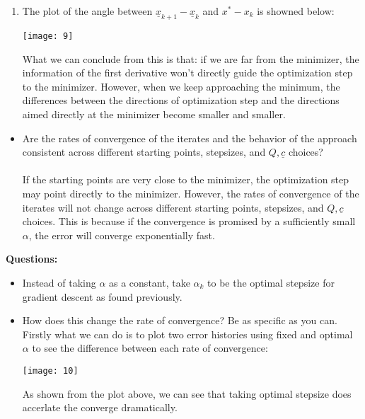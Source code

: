 \documentclass[11pt,letterpaper]{article}
\begin{document}
\begin{tcolorbox}
    \begin{enumerate}[\quad\quad]
        \item The plot of the angle between $\underline x_{k+1}-\underline x_k$ and $x^\ast - x_k$ is showned below:
        \begin{center}
            \texttt{[image: 9]}
        \end{center}
        \begin{flushleft}
        \justifying
            What we can conclude from this is that: if we are far from the minimizer, the information of the first derivative won't directly guide the optimization step to the minimizer. However, when we keep approaching the minimum, the differences between the directions of optimization step and the directions aimed directly at the minimizer become smaller and smaller.
        \end{flushleft}
    \end{enumerate}
    \bigskip
    \begin{itemize}
        \item Are the rates of convergence of the iterates and the behavior of the approach consistent across different starting points, stepsizes, and $Q, \underline c$ choices?
        \\\\
        If the starting points are very close to the minimizer, the optimization step may point directly to the minimizer. However, the rates of convergence of the iterates will not change across different starting points, stepsizes, and $Q, \underline c$ choices. This is because if the convergence is promised by a sufficiently small $\alpha$, the error will converge exponentially fast. 
    \end{itemize}
\end{tcolorbox}

\begin{tcolorbox}
    \textbf{Questions:}
    \begin{itemize}
        \item Instead of taking $\alpha$ as a constant, take $\alpha_k$ to be the optimal stepsize for gradient descent as found previously.
        \item How does this change the rate of convergence? Be as specific as you can.
        \\
        Firstly what we can do is to plot two error histories using fixed and optimal $\alpha$ to see the difference between each rate of convergence:
        \begin{center}
            \texttt{[image: 10]}
        \end{center}
        As shown from the plot above, we can see that taking optimal stepsize does accerlate the converge dramatically. 
    \end{itemize}
\end{tcolorbox}
\end{document}
